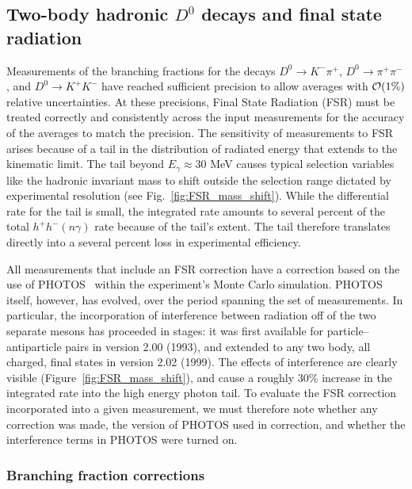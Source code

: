 \subsection{Two-body hadronic $D^0$ decays and final state radiation}

Measurements of the branching fractions for the decays $D^0\to K^-\pi^+$,
$D^0\to \pi^+\pi^-$, and $D^0\to K^+ K^-$ have reached sufficient precision to
allow averages with ${\cal O}(1\%)$ relative uncertainties. 
At these precisions, Final 
State Radiation (FSR) must be treated correctly and consistently across 
the input measurements for the accuracy of the averages to match the 
precision.  The sensitivity of measurements to FSR arises because of 
a tail in the distribution of radiated energy that extends to the 
kinematic limit.  The tail beyond $E_\gamma \approx 30$ MeV causes 
typical selection variables like the hadronic invariant mass to 
shift outside the selection range dictated by experimental 
resolution (see Fig.~\ref{fig:FSR_mass_shift}).  While the 
differential rate for the tail is small, the integrated rate 
amounts to several percent of the total $h^+ h^-(n\gamma)$ 
rate because of the tail's extent.  The tail therefore 
translates directly into a several percent loss in 
experimental efficiency.

All measurements that include an FSR correction 
have a correction based on the use of 
PHOTOS~\cite{Barberio:1990ms,Barberio:1993qi,Golonka:2005pn,Golonka:2006tw} 
within the experiment's Monte Carlo simulation.  
PHOTOS itself, however, has evolved, over the period spanning the set of
measurements.  In particular, the incorporation of interference between
radiation off of the two separate mesons has proceeded in stages: it was first
available for particle--antiparticle pairs in version 2.00 (1993), and extended 
to any two body, all charged, final states in version 2.02 (1999).  
The effects of interference are clearly visible 
(Figure~\ref{fig:FSR_mass_shift}), and cause a 
roughly 30\% increase in the integrated rate into 
the high energy photon tail.  To evaluate the FSR 
correction incorporated into a given measurement, 
we must therefore note whether any correction was 
made, the version of PHOTOS used in correction, 
and whether the interference terms in PHOTOS were 
turned on.  

\subsubsection{Branching fraction corrections}

